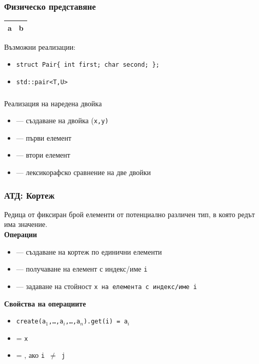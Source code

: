 \documentclass{beamer}
\begin{document}
\begin{frame}[fragile]
  \frametitle{Физическо представяне}

  \begin{center}
    \begin{tabular}{|m{5ex}|m{8ex}|}
      \hline
      \rowcolor{diagramblue}
      a&b\\
      \hline
    \end{tabular}
  \end{center}
  \vspace{2em}

  Възможни реализации:
  \begin{itemize}[<+->]
  \item \verb#struct Pair{ int first; char second; };#
  \item \verb#std::pair<T,U>#
  \end{itemize}
\end{frame}

\begin{frame}
  \frametitle{}

  Реализация на наредена двойка
  \begin{itemize}
  \item {} --- създаване на двойка (\tt x,\tt y)
  \item {} --- първи елемент
  \item {} --- втори елемент
  \item \lst{==,!=,<,>,<=,>=} --- лексикорафско сравнение на две двойки
  \end{itemize}
\end{frame}

\begin{frame}
  \frametitle{АТД: Кортеж}

  Редица от фиксиран брой елементи от потенциално различен тип, в която редът има значение.\\[0.5em]

  \textbf{Операции}\\[0.5em]
  \begin{itemize}
  \item {} --- създаване на кортеж по единични елементи
  \item {} --- получаване на елемент с индекс/име \tt i
  \item {} --- задаване на стойност \tt x на елемента с индекс/име \tt i
  \end{itemize}

  \textbf{Свойства на операциите}\\[0.5em]
  \begin{itemize}
  \item \tt{create(a$_1$,\ldots,a$_i$,\ldots,a$_n$).get(i)} = \tt{a$_i$}
  \item {} = \tt x
  \item {} = , ако \tt{i $\neq$ j}
  \end{itemize}  
\end{frame}
\end{document}
